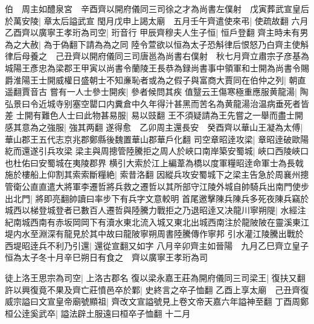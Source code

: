 伯　周主如醴泉宮　辛酉齊以開府儀同三司徐之才為尚書左僕射　戊寅葬武宣皇后於萬安陵|{
	章太后謚武宣}
閠月戊申上謁太廟　五月壬午齊遣使來弔|{
	使疏故翻}
六月乙酉齊以廣寧王孝珩為司空|{
	珩音行}
甲辰齊穆夫人生子恒|{
	恒戶登翻}
齊主時未有男為之大赦|{
	為于偽翻下請為為之同}
陸令萱欲以恒為太子恐斛律后恨怒乃白齊主使斛律后母養之　己丑齊以開府儀同三司唐邕為尚書右僕射　秋七月齊立肅宗子彦基為城陽王彥忠為梁郡王甲寅以尚書令蘭陵王長恭為録尚書事中領軍和士開為尚書令賜爵淮陽王士開威權日盛朝士不知亷恥者或為之假子與富商大賈同在伯仲之列|{
	朝直遥翻賈音古}
嘗有一人士參士開疾|{
	參者候問其疾}
值毉云王傷寒極重應服黄龍湯|{
	陶弘景曰令近城寺别塞空罌口内糞倉中久年得汁甚黑而苦名為黄龍湯治温病垂死者皆差}
士開有難色人士曰此物甚易服|{
	易以豉翻}
王不須疑請為王先嘗之一舉而盡士開感其意為之強服|{
	強其两翻}
遂得愈　乙卯周主還長安　癸酉齊以華山王凝為太傅|{
	華山郡王五代志京兆郡鄭縣後魏置華山郡華戶化翻}
司空章昭逹攻梁|{
	章昭逹破歐陽紇而還遂引兵攻梁}
梁主與周摠管陸騰拒之周人於峽口南岸築安蜀城|{
	峽口西陵峽口也杜佑曰安蜀城在夷陵郡界}
横引大索於江上編葦為橋以度軍糧昭逹命軍士為長戟施於樓船上仰割其索索斷糧絶|{
	索昔洛翻}
因縱兵攻安蜀城下之梁主告急於周襄州摠管衛公直直遣大將軍李遷哲將兵救之遷哲以其所部守江陵外城自帥騎兵出南門使步出北門|{
	將即亮翻帥讀曰率步下有兵字文意較明}
首尾邀擊陳兵陳兵多死夜陳兵竊於城西以梯登城登者已數百人遷哲與陸騰力戰拒之乃退昭逹又决龍川寧朔隄|{
	水經注紀南城西南有赤坂岡岡下有瀆水東北流入城又東北出城西南注於龍陂陂在靈溪東江堤内水至淵深有龍見於其中故曰龍陂寧朔周書陸騰傳作寧邦}
引水灌江陵騰出戰於西堤昭逹兵不利乃引還|{
	還從宣翻又如字}
八月辛卯齊主如晉陽　九月乙巳齊立皇子恒為太子冬十月辛巳朔日有食之　齊以廣寧王孝珩為司

徒上洛王思宗為司空|{
	上洛古郡名}
復以梁永嘉王莊為開府儀同三司梁王|{
	復扶又翻}
許以興復竟不果及齊亡莊憤邑卒於鄴|{
	史終言之卒子恤翻}
乙酉上享太廟　己丑齊復威宗謚曰文宣皇帝廟號顯祖|{
	齊改文宣謚號見上卷文帝天嘉六年謚神至翻}
丁酉周鄭桓公逹奚武卒|{
	謚法辟土服遠曰桓卒子恤翻}
十二月

